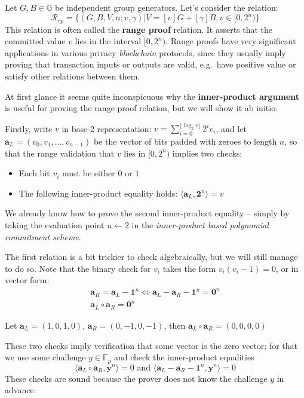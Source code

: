 \documentclass[../lecture-notes-148x210.tex]{subfiles}
\begin{document}
Let $G,B\in \mathbb{G}$ be independent group generators. Let's consider the relation:
$$\mathcal{R}_{rp} = \{ (G, B, V, n; v, \gamma) \vert V = [v]G + [\gamma]B, v \in [0, 2^n) \}$$
This relation is often called the \textbf{range proof} relation. It asserts that the committed value $v$ lies in the interval $[0, 2^n)$. Range proofs have very significant applications in various privacy \textit{blockchain} protocols, since they usually imply proving that transaction inputs or outputs are valid, e.g.\ have positive value or satisfy other relations between them.

At first glance it seems quite inconspicuous why the \textbf{inner-product argument} is useful for proving the range proof relation, but we will show it ab initio.

Firstly, write $v$ in base-2 representation: $v = \sum_{i=0}^{\lfloor \log_2 v \rfloor} 2^i v_i$, and let $\mathbf{a}_L = (v_0, v_1, \dots, v_{n-1})$ be the vector of bits padded with zeroes to length $n$, so that the range validation that $v$ lies in $[0, 2^n)$ implies two checks:
\begin{itemize}
    \item Each bit $v_i$ must be either $0$ or $1$
    \item The following inner-product equality holds: $\langle \mathbf{a}_L, \mathbf{2}^n \rangle = v$
\end{itemize}

We already know how to prove the second inner-product equality -- simply by taking the evaluation point $u \gets 2$ in the \textit{inner-product based polynomial commitment scheme}.

The first relation is a bit trickier to check algebraically, but we will still manage to do so. Note that the binary check for $v_i$ takes the form $v_i(v_i - 1) = 0$, or in vector form:
\begin{align*}
    \mathbf{a}_R = \mathbf{a}_L - \mathbf{1}^n \Leftrightarrow  \mathbf{a}_L - \mathbf{a}_R - \mathbf{1}^n = \mathbf{0}^n \\
    \mathbf{a}_L \circ \mathbf{a}_R = \mathbf{0}^n
\end{align*}

\begin{example}
    Let $\mathbf{a}_L = (1, 0, 1, 0)$, $\mathbf{a}_R = (0, -1, 0, -1)$, then 
    $\mathbf{a}_L \circ \mathbf{a}_R = (0, 0, 0, 0)$
\end{example}

These two checks imply verification that some vector is the zero vector; for that we use some challenge $y \in \mathbb{F}_p$ and check the inner-product equalities $$\langle \mathbf{a}_L \circ \mathbf{a}_R, \mathbf{y}^n \rangle = 0 \text{ and } \langle \mathbf{a}_L - \mathbf{a}_R - \mathbf{1}^n, \mathbf{y}^n \rangle = 0$$
These checks are sound because the prover does not know the challenge $y$ in advance.
\end{document}
